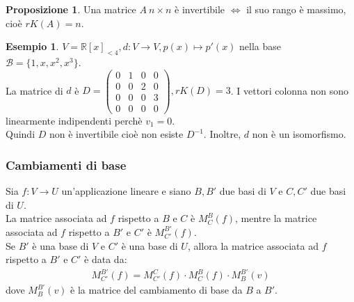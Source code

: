 \documentclass[a4paper]{article}
\theoremstyle{definition}
\newtheorem*{es}{Esempio}
\newtheorem*{prop}{Proposizione}
\begin{document}
\begin{prop}
	Una matrice $A \ n \times n$ è invertibile $\Leftrightarrow$ il suo rango è massimo, cioè $rK(A) = n$.
\end{prop}

\begin{es}
	$V = \mathbb{R}[x]_{< 4}, d: V \rightarrow V, p(x) \mapsto p'(x)$ nella base $\mathcal{B} = \{1, x, x^2, x^3\}$. \\
	La matrice di $d$ è $D = \begin{pmatrix}
			0 & 1 & 0 & 0 \\
			0 & 0 & 2 & 0 \\
			0 & 0 & 0 & 3 \\
			0 & 0 & 0 & 0
		\end{pmatrix}, rK(D) = 3$. I vettori colonna non sono linearmente indipendenti perchè $v_1 = 0$. \\
	Quindi $D$ non è invertibile cioè non esiste $D^{-1}$. Inoltre, $d$ non è un isomorfismo.
\end{es}

\subsubsection{Cambiamenti di base}
Sia $f: V \rightarrow U$ un'applicazione lineare e siano $B, B'$ due basi di $V$ e $C, C'$ due basi di $U$. \\
La matrice associata ad $f$ rispetto a $B$ e $C$ è $M_C^B(f)$, mentre la matrice associata ad $f$ rispetto a $B'$ e $C'$ è $M_{C'}^{B'}(f)$. \\
Se $B'$ è una base di $V$ e $C'$ è una base di $U$, allora la matrice associata ad $f$ rispetto a $B'$ e $C'$ è data da:
\begin{align*}
	M_{C'}^{B'}(f) = M_{C'}^C(f) \cdot M_C^B(f) \cdot M_B^{B'}(v)
\end{align*}
dove $M_B^{B'}(v)$ è la matrice del cambiamento di base da $B$ a $B'$.
\end{document}
